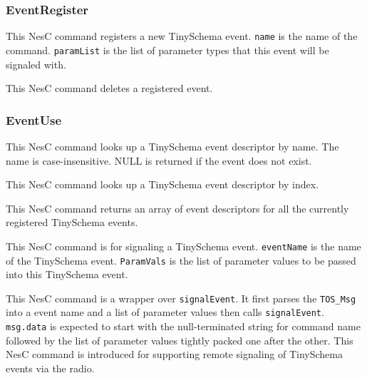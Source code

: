\documentclass[11pt]{article}
\begin{document}
\subsubsection{EventRegister}


This NesC command registers a new TinySchema event.  {\tt name} is the
name of the command.  
{\tt paramList} is the list of parameter types that this
event will be signaled with.


This NesC command deletes a registered event.

\subsubsection{EventUse}


This NesC command looks up a TinySchema event descriptor by name.  The name
is case-insensitive.  NULL is returned
if the event does not exist.



This NesC command looks up a TinySchema event descriptor by index.


This NesC command returns an array of event descriptors for all
the currently registered TinySchema events.



This NesC command is for signaling a TinySchema event.  {\tt eventName} is
the name of the TinySchema event.
{\tt ParamVals} is the
list of parameter values to be passed into this TinySchema event.


This NesC command is a wrapper over {\tt signalEvent}.  It first parses the
{\tt TOS\_Msg} into a event name and a list of parameter values then calls
{\tt signalEvent}.  {\tt msg.data} is expected to start with the null-terminated
string for command name followed by the list of parameter values tightly
packed one after the other.  This NesC command is introduced for
supporting remote signaling of TinySchema events via the radio.
\end{document}
